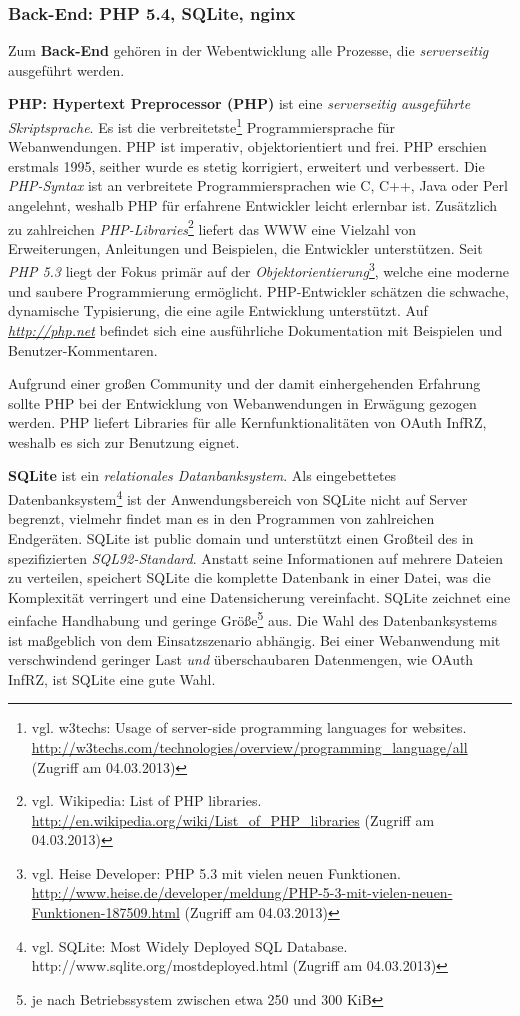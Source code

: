 \documentclass[12pt,a4paper,pointednumbers,abstracton]{scrartcl}
\begin{document}
\subsubsection{Back-End: PHP 5.4, SQLite, nginx}
\label{sec:oauth-infrz/back-end}

Zum \textbf{Back-End} gehören in der Webentwicklung alle Prozesse, die \emph{serverseitig} ausgeführt werden.

\textbf{PHP: Hypertext Preprocessor (PHP)} ist eine \emph{serverseitig ausgeführte Skriptsprache}.
Es ist die verbreitetste\footnote{vgl. w3techs: Usage of server-side programming languages for websites. \url{http://w3techs.com/technologies/overview/programming_language/all} (Zugriff am 04.03.2013)} Programmiersprache für Webanwendungen.
PHP ist imperativ, objektorientiert und frei.
PHP erschien erstmals 1995, seither wurde es stetig korrigiert, erweitert und verbessert.
Die \emph{PHP-Syntax} ist an verbreitete Programmiersprachen wie C, C++, Java oder Perl angelehnt, weshalb PHP für erfahrene Entwickler leicht erlernbar ist.
Zusätzlich zu zahlreichen \emph{PHP-Libraries}\footnote{vgl. Wikipedia: List of PHP libraries. \url{http://en.wikipedia.org/wiki/List_of_PHP_libraries} (Zugriff am 04.03.2013)} liefert  das WWW eine Vielzahl von Erweiterungen, Anleitungen und Beispielen, die Entwickler unterstützen.
Seit \emph{PHP 5.3} liegt der Fokus primär auf der \emph{Objektorientierung}\footnote{vgl. Heise Developer: PHP 5.3 mit vielen neuen Funktionen. \url{http://www.heise.de/developer/meldung/PHP-5-3-mit-vielen-neuen-Funktionen-187509.html} (Zugriff am 04.03.2013)}, welche eine moderne und saubere Programmierung ermöglicht.
PHP-Entwickler schätzen die schwache, dynamische Typisierung, die eine agile Entwicklung unterstützt.
Auf \emph{\url{http://php.net}} befindet sich eine ausführliche Dokumentation mit Beispielen und Benutzer-Kommentaren.

Aufgrund einer großen Community und der damit einhergehenden Erfahrung sollte PHP bei der Entwicklung von Webanwendungen in Erwägung gezogen werden.
PHP liefert Libraries für alle Kernfunktionalitäten von OAuth InfRZ, weshalb es sich zur Benutzung eignet.

\textbf{SQLite} ist ein \emph{relationales Datanbanksystem}.
Als eingebettetes Datenbanksystem\footnote{vgl. SQLite: Most Widely Deployed SQL Database. http://www.sqlite.org/mostdeployed.html (Zugriff am 04.03.2013)} ist der Anwendungsbereich von SQLite nicht auf Server begrenzt, vielmehr findet man es in den Programmen von zahlreichen Endgeräten.
SQLite ist public domain und unterstützt einen Großteil des in \cite{SQL1992} spezifizierten \emph{SQL92-Standard}.
Anstatt seine Informationen auf mehrere Dateien zu verteilen, speichert SQLite die komplette Datenbank in einer Datei, was die Komplexität verringert und eine Datensicherung vereinfacht.
SQLite zeichnet eine einfache Handhabung und geringe Größe\footnote{je nach Betriebssystem zwischen etwa 250 und 300 KiB} aus.
Die Wahl des Datenbanksystems ist maßgeblich von dem Einsatzszenario abhängig. Bei einer Webanwendung mit verschwindend geringer Last \emph{und} überschaubaren Datenmengen, wie OAuth InfRZ, ist SQLite eine gute Wahl.
\end{document}
